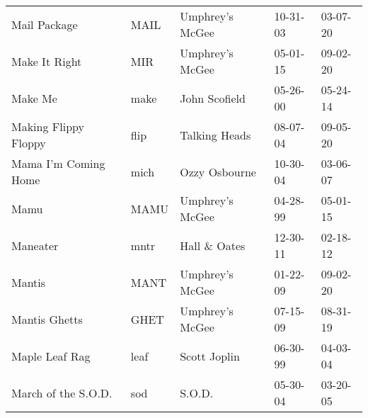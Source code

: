 \begin{longtable}{p{}p{}p{}p{}p{}}
                                                            Mail Package &          MAIL &                                          Umphrey's McGee &              10-31-03 &             03-07-20 \\
                                                           Make It Right &           MIR &                                          Umphrey's McGee &              05-01-15 &             09-02-20 \\
                                                                 Make Me &          make &                                            John Scofield &              05-26-00 &             05-24-14 \\
                                                    Making Flippy Floppy &          flip &                                            Talking Heads &              08-07-04 &             09-05-20 \\
                                                    Mama I'm Coming Home &          mich &                                            Ozzy Osbourne &              10-30-04 &             03-06-07 \\
                                                                    Mamu &          MAMU &                                          Umphrey's McGee &              04-28-99 &             05-01-15 \\
                                                                Maneater &          mntr &                                            Hall \& Oates &              12-30-11 &             02-18-12 \\
                                                                  Mantis &          MANT &                                          Umphrey's McGee &              01-22-09 &             09-02-20 \\
                                                           Mantis Ghetts &          GHET &                                          Umphrey's McGee &              07-15-09 &             08-31-19 \\
                                                          Maple Leaf Rag &          leaf &                                             Scott Joplin &              06-30-99 &             04-03-04 \\
                                                     March of the S.O.D. &           sod &                                                   S.O.D. &              05-30-04 &             03-20-05 \\

\end{longtable}
